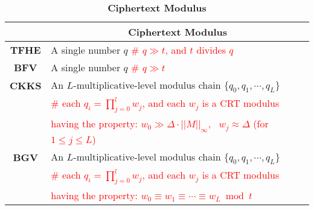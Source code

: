 \begin{table}[h]
\begin{tabular}{|c||l|}
\hline
&\multicolumn{1}{c|}{\textbf{Ciphertext Modulus}}\\\hline\hline
\textbf{TFHE}&A single number $q$ \text{ } \textcolor{red}{ \# $q \gg t$, and $t$ divides $q$}\\\hline
\textbf{BFV}&A single number $q$ \text{ } \textcolor{red}{ \# $q \gg t$}\\\hline
\textbf{CKKS}&An $L$-multiplicative-level modulus chain $\{q_0, q_1, \cdots, q_L\}$\\
& \text{ } \textcolor{red}{ \# each $q_i = \prod\limits_{j=0}^{l}w_j$, and each $w_j$ is a CRT modulus}\\
&\text{ } \text{ } \text{ } \textcolor{red}{ having the property: $w_0 \gg \Delta \cdot ||M||_{\infty}, \text{ } w_j \approx \Delta$ (for $1 \leq j \leq L$)}\\\hline
\textbf{BGV}&An $L$-multiplicative-level modulus chain $\{q_0, q_1, \cdots, q_L\}$\\
&\text{ } \textcolor{red}{ \# each $q_i = \prod\limits_{j=0}^{l}w_j$, and each $w_j$ is a CRT modulus}\\
&\text{ } \text{ } \text{ } \textcolor{red}{ having the property: $w_0 \equiv w_1 \equiv \cdots \equiv w_L \bmod t$}\\\hline
\end{tabular}
\caption{\textbf{Ciphertext Modulus}}
\end{table}



